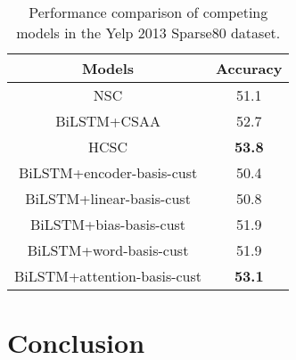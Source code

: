 \documentclass[11pt,a4paper]{article}
\begin{document}
\begin{table}[t]
    \centering
    \begin{tabular}{|c|c|}
        \hline
        Models & Accuracy \\
        \hline
        NSC & 51.1 \\
        BiLSTM+CSAA & 52.7 \\
        HCSC & \textbf{53.8} \\
        \hline
        BiLSTM+encoder-basis-cust & 50.4 \\
        BiLSTM+linear-basis-cust & 50.8 \\
        BiLSTM+bias-basis-cust & 51.9 \\
        BiLSTM+word-basis-cust & 51.9 \\
        BiLSTM+attention-basis-cust & \textbf{53.1} \\
        \hline
    \end{tabular}
    \caption{Performance comparison of competing models in the Yelp 2013 Sparse80 dataset.}
    \label{tab:sparse}
\end{table}







\begin{comment}
\begin{table}[t]
  \footnotesize
  \centering
    \begin{tabular}{|l|ccc|}
    \hline
    Models & \multicolumn{1}{l}{Yelp} & \multicolumn{1}{l}{AAPR} & \multicolumn{1}{l|}{PolMed} \\
    \hline
    dominant class &  41.14     &  51.15   & 30.00    \\
    MLP+non-text & 47.12 & 65.00 &  35.58 \\
    BiLSTM+cust (best) & 65.37  & \textcolor[rgb]{ 1,  0,  0}{63.55}&  40.93 \\
    BiLSTM+basis-cust (best) & 67.05 & 65.85  & 41.89  \\
    \hline
    \end{tabular}\caption{Comparison of accuracies of using only the categories for classification (MLP+non-text) and the best models of Customized BiLSTM (BiLSTM+cust) and Basis-Customized BiLSTM (BiLSTM+basis-cust). Results colored \textcolor{red}{red} are accuracies worse than the MLP+non-text.}
  \label{tab:biasresult}\end{table}\end{comment}

\section{Conclusion}
\end{document}
